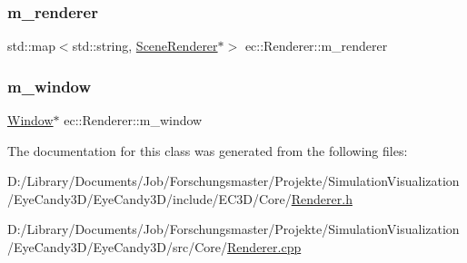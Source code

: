 \mbox{\label{classec_1_1_renderer_ac3f0c1c3253fbac0f734af313cc410a4}} 
\subsubsection{\texorpdfstring{m\+\_\+renderer}{m\_renderer}}
{\footnotesize\ttfamily std\+::map$<$std\+::string, \mbox{\hyperlink{classec_1_1_scene_renderer}{Scene\+Renderer}}$\ast$$>$ ec\+::\+Renderer\+::m\+\_\+renderer\hspace{0.3cm}{\ttfamily [protected]}}

\mbox{\label{classec_1_1_renderer_ac23d74f9d295bf833f095bdff8c8169b}} 
\subsubsection{\texorpdfstring{m\+\_\+window}{m\_window}}
{\footnotesize\ttfamily \mbox{\hyperlink{classec_1_1_window}{Window}}$\ast$ ec\+::\+Renderer\+::m\+\_\+window\hspace{0.3cm}{\ttfamily [protected]}}



The documentation for this class was generated from the following files\+:\begin{DoxyCompactItemize}
\item 
D\+:/\+Library/\+Documents/\+Job/\+Forschungsmaster/\+Projekte/\+Simulation\+Visualization/\+Eye\+Candy3\+D/\+Eye\+Candy3\+D/include/\+E\+C3\+D/\+Core/\mbox{\hyperlink{_renderer_8h}{Renderer.\+h}}\item 
D\+:/\+Library/\+Documents/\+Job/\+Forschungsmaster/\+Projekte/\+Simulation\+Visualization/\+Eye\+Candy3\+D/\+Eye\+Candy3\+D/src/\+Core/\mbox{\hyperlink{_renderer_8cpp}{Renderer.\+cpp}}\end{DoxyCompactItemize}
